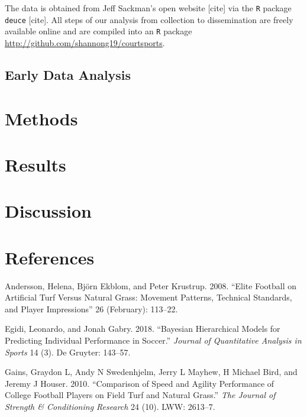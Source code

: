 \documentclass[]{article}
\begin{document}
The data is obtained from Jeff Sackman's open website {[}cite{]} via the
\texttt{R} package \texttt{deuce} {[}cite{]}. All steps of our analysis
from collection to dissemination are freely available online and are
compiled into an \texttt{R} package
\url{http://github.com/shannong19/courtsports}.

\hypertarget{sec:eda}{%
\subsection{Early Data Analysis}\label{sec:eda}}

\hypertarget{sec:methods}{%
\section{Methods}\label{sec:methods}}

\hypertarget{sec:results}{%
\section{Results}\label{sec:results}}

\hypertarget{sec:discussion}{%
\section{Discussion}\label{sec:discussion}}

\hypertarget{sec:refs}{%
\section*{References}\label{sec:refs}}

\hypertarget{refs}{}
\leavevmode\hypertarget{ref-andersson2008}{}%
Andersson, Helena, Björn Ekblom, and Peter Krustrup. 2008. ``Elite
Football on Artificial Turf Versus Natural Grass: Movement Patterns,
Technical Standards, and Player Impressions'' 26 (February): 113--22.

\leavevmode\hypertarget{ref-egidi2018}{}%
Egidi, Leonardo, and Jonah Gabry. 2018. ``Bayesian Hierarchical Models
for Predicting Individual Performance in Soccer.'' \emph{Journal of
Quantitative Analysis in Sports} 14 (3). De Gruyter: 143--57.

\leavevmode\hypertarget{ref-gains2010}{}%
Gains, Graydon L, Andy N Swedenhjelm, Jerry L Mayhew, H Michael Bird,
and Jeremy J Houser. 2010. ``Comparison of Speed and Agility Performance
of College Football Players on Field Turf and Natural Grass.'' \emph{The
Journal of Strength \& Conditioning Research} 24 (10). LWW: 2613--7.
\end{document}
